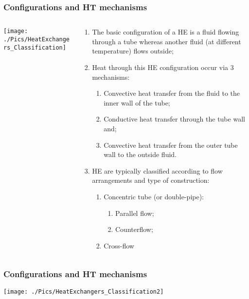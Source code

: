 \documentclass[10pt,compress,handout,ignorenonframetext,unknownkeysallowed]{beamer}
\begin{document}
\begin{frame}
  \frametitle{Configurations and HT mechanisms}
    \begin{columns}
       \begin{column}[l]{0.5\linewidth}
         \texttt{[image: ./Pics/HeatExchangers\_Classification]}
       \end{column}
       \begin{column}[l]{0.5\linewidth}
         \begin{enumerate}\scriptsize
            \item<1-> The basic configuration of a HE is a fluid flowing through a tube whereas another fluid (at different temperature) flows outside;
            \item<2-> Heat through this HE configuration occur via 3 mechanisms:
              \begin{enumerate}\scriptsize
                 \item<2-> Convective heat transfer from the fluid to the inner wall of the tube;
                 \item<2-> Conductive heat transfer through the tube wall and;
                 \item<2-> Convective heat transfer from the outer tube wall to the outside fluid.
              \end{enumerate}
            \item<3-> HE are typically classified according to flow arrangements and type of construction:
              \begin{enumerate}\scriptsize
                  \item<3-> Concentric tube (or double-pipe):
                       \begin{enumerate}\scriptsize
                          \item<3-> Parallel flow;
                          \item<3-> Counterflow;
                       \end{enumerate}
                  \item<3-> Cross-flow
              \end{enumerate}
         \end{enumerate}
       \end{column}      
    \end{columns}
\end{frame}


\begin{frame}
  \frametitle{Configurations and HT mechanisms}
    \begin{center}
         \texttt{[image: ./Pics/HeatExchangers\_Classification2]}
    \end{center}
\end{frame}
\end{document}
